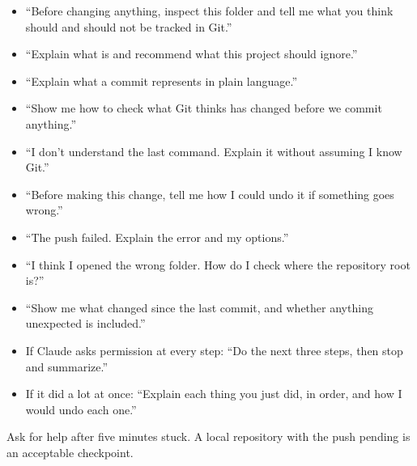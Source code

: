 \begin{itemize}
  \item ``Before changing anything, inspect this folder and tell me what you think should and should not be tracked in Git.''
  \item ``Explain what  is and recommend what this project should ignore.''
  \item ``Explain what a commit represents in plain language.''
  \item ``Show me how to check what Git thinks has changed before we commit anything.''
  \item ``I don't understand the last command. Explain it without assuming I know Git.''
  \item ``Before making this change, tell me how I could undo it if something goes wrong.''
\end{itemize}

\par
{}\par
{}\par
{}\par
{}\par
{}\par
{}\par
{}

\begin{itemize}
  \item ``The push failed. Explain the error and my options.''
  \item ``I think I opened the wrong folder. How do I check where the repository root is?''
  \item ``Show me what changed since the last commit, and whether anything unexpected is included.''
  \item If Claude asks permission at every step: ``Do the next three steps, then stop and summarize.''
  \item If it did a lot at once: ``Explain each thing you just did, in order, and how I would undo each one.''
\end{itemize}
Ask for help after five minutes stuck. A local repository with the push pending is an acceptable checkpoint.

